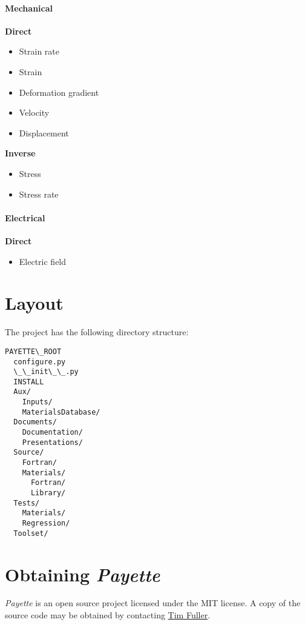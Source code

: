 \documentclass[letterpaper,10pt,english]{sphinxmanual}
\begin{document}
\subsubsection{Mechanical}
\label{Files/introduction:mechanical}
\textbf{Direct}
\begin{itemize}
\item {} 
Strain rate

\item {} 
Strain

\item {} 
Deformation gradient

\item {} 
Velocity

\item {} 
Displacement

\end{itemize}

\textbf{Inverse}
\begin{itemize}
\item {} 
Stress

\item {} 
Stress rate

\end{itemize}


\subsubsection{Electrical}
\label{Files/introduction:electrical}
\textbf{Direct}
\begin{itemize}
\item {} 
Electric field

\end{itemize}


\chapter{Layout}
\label{Files/layout:layout}\label{Files/layout::doc}
The  project has the following directory structure:

\begin{Verbatim}[commandchars=\\\{\}]
PAYETTE\_ROOT
  configure.py
  \_\_init\_\_.py
  INSTALL
  Aux/
    Inputs/
    MaterialsDatabase/
  Documents/
    Documentation/
    Presentations/
  Source/
    Fortran/
    Materials/
      Fortran/
      Library/
  Tests/
    Materials/
    Regression/
  Toolset/
\end{Verbatim}


\chapter{Obtaining \emph{Payette}}
\label{Files/obtaining:obtaining-payette}\label{Files/obtaining::doc}
\emph{Payette} is an open source project licensed under the MIT license. A copy of
the source code may be obtained by contacting \href{mailto:tjfulle@sandia.gov}{Tim Fuller}.
\end{document}
